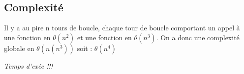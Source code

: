 \subsection{Complexité}

Il y a au pire n tours de boucle, chaque tour de boucle comportant un appel à une fonction en $\theta{(n^2)}$ et une fonction en $\theta{(n^3)}$. On a donc une complexité globale en $\theta{(n(n^3))}$ soit :
$\theta{(n^4)}$

\emph{Temps d'exéc !!!} 